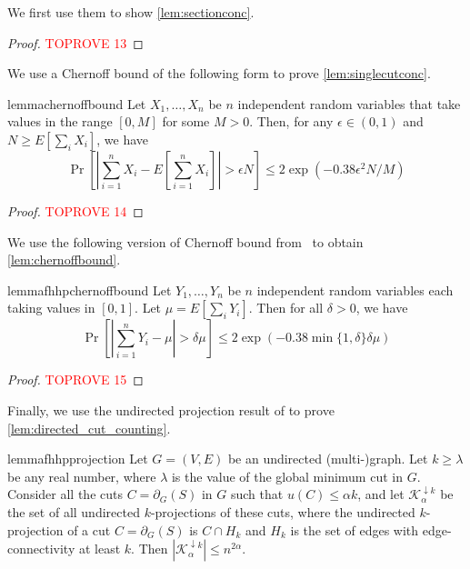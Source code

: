 \documentclass[11pt,a4paper]{article}
\newcommand{\abs}[1]{\ensuremath{\left| #1 \right|}}
\newcommand{\eps}{\epsilon}
\begin{document}
We first use them to show \cref{lem:sectionconc}.

\sectionconc*

\begin{proof}\textcolor{red}{TOPROVE 13}\end{proof}

We use a Chernoff bound of the following form to prove \cref{lem:singlecutconc}.

\begin{restatable}{lemma}{chernoffbound}
\label{lem:chernoffbound}
Let $X_1, \ldots, X_n$ be $n$ independent random variables that take values in the range $[0,M]$ for some $M > 0$.
Then, for any $\eps \in (0, 1)$ and $N \ge E[\sum_i X_i]$, we have
\[
\Pr \left[ \abs{\sum_{i=1}^n X_i - E\left[ \sum_{i=1}^n X_i \right]} > \eps N \right]
\le 2 \exp(- 0.38 \eps^2 N / M)
\]
\end{restatable}

\singlecutconc*
\begin{proof}\textcolor{red}{TOPROVE 14}\end{proof}

We use the following version of Chernoff bound from~\cite{FHHP19sparsification} to obtain \cref{lem:chernoffbound}.

\begin{restatable}{lemma}{fhhpchernoffbound}
\label{lem:fhhpchernoffbound}
Let $Y_1, \ldots, Y_n$ be $n$ independent random variables each taking values in $[0,1]$. Let $\mu = E[\sum_i Y_i]$. Then for all $\delta > 0$, we have
\[
\Pr \left[ \abs{\sum_{i =1}^n Y_i - \mu} > \delta \mu \right]
\le 2 \exp \left( - 0.38 \min \{ 1, \delta \} \delta \mu \right)
\]
\end{restatable}

\chernoffbound*
\begin{proof}\textcolor{red}{TOPROVE 15}\end{proof}

Finally, we use the undirected projection result of \cite{FHHP19sparsification} to prove \cref{lem:directed_cut_counting}.

\begin{restatable}{lemma}{fhhpprojection}
\label{lem:fhhpprojection}
Let $G = (V, E)$ be an undirected (multi-)graph. Let $k \ge \lambda$ be any real number, where $\lambda$ is the value of the global minimum cut in $G$. Consider all the cuts $C = \partial_G(S)$ in $G$ such that $u(C) \le \alpha k$, and let $\mathcal K^{\downarrow k}_{\alpha}$ be the set of all undirected $k$-projections of these cuts, where the undirected $k$-projection of a cut $C = \partial_G(S)$ is $C \cap H_k$ and $H_k$ is the set of edges with edge-connectivity at least $k$. Then $|\mathcal K^{\downarrow k}_\alpha| \le n^{2\alpha}$.
\end{restatable}
\end{document}

